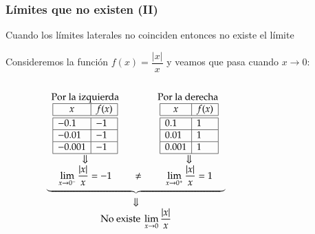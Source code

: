 \begin{frame}
\frametitle{Límites que no existen (II)}
Cuando los límites laterales no coinciden entonces no existe el límite

 Consideremos la función $f(x)=\dfrac{|x|}{x}$ y veamos que pasa cuando $x\rightarrow 0$:
\begin{columns}
\begin{column}{0.6\textwidth}
\[
\begin{array}{c}
\underbrace{\begin{array}{ccc}
\textrm{Por la izquierda} & \qquad & \textrm{Por la derecha }\\
\begin{array}{|l|l|}
\hline
\multicolumn{1}{|c|}{x}      & \multicolumn{1}{c|}{f(x)}   \\
\hline\hline
 -0.1   & -1       \\
\hline
 -0.01   & -1     \\
\hline
 -0.001  & -1   \\
\hline
\end{array}
& &
\begin{array}{|l|l|}
\hline
\multicolumn{1}{|c|}{x}      & \multicolumn{1}{c|}{f(x)}   \\
\hline\hline
 0.1    & 1       \\
\hline
 0.01   & 1    \\
\hline
 0.001  & 1   \\
\hline
\end{array}\\
\Downarrow & & \Downarrow\\
\displaystyle \lim_{x\rightarrow 0^-}\frac{|x|}{x}=-1
&\neq &
\displaystyle \lim_{x\rightarrow 0^+}\frac{|x|}{x}=1
\end{array}}\\
\Downarrow\\
\displaystyle \textrm{No existe }\lim_{x\rightarrow 0}\frac{|x|}{x}
\end{array}
\]
\end{column}
\begin{column}{0.4\textwidth}
\begin{center}
\scalebox{1}{}
\end{center}
\end{column}
\end{columns}
\end{frame}


